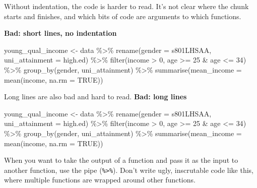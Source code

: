 \documentclass[
]{book}
\newenvironment{Shaded}{\begin{snugshade}}{\end{snugshade}}
\newcommand{\AttributeTok}[1]{\textcolor[rgb]{0.77,0.63,0.00}{#1}}
\newcommand{\ConstantTok}[1]{\textcolor[rgb]{0.00,0.00,0.00}{#1}}
\newcommand{\DecValTok}[1]{\textcolor[rgb]{0.00,0.00,0.81}{#1}}
\newcommand{\FunctionTok}[1]{\textcolor[rgb]{0.00,0.00,0.00}{#1}}
\newcommand{\NormalTok}[1]{#1}
\newcommand{\OtherTok}[1]{\textcolor[rgb]{0.56,0.35,0.01}{#1}}
\newcommand{\SpecialCharTok}[1]{\textcolor[rgb]{0.00,0.00,0.00}{#1}}
\begin{document}
Without indentation, the code is harder to read. It's not clear where the chunk starts and finishes, and which bits of code are arguments to which functions.

\textbf{Bad: short lines, no indentation}

\begin{Shaded}
\begin{Highlighting}[]
\NormalTok{young\_qual\_income }\OtherTok{\textless{}{-}}\NormalTok{ data }\SpecialCharTok{\%\textgreater{}\%} 
\FunctionTok{rename}\NormalTok{(}\AttributeTok{gender =}\NormalTok{ s801LHSAA,}
\AttributeTok{uni\_attainment =}\NormalTok{ high.ed) }\SpecialCharTok{\%\textgreater{}\%} 
\FunctionTok{filter}\NormalTok{(income }\SpecialCharTok{\textgreater{}} \DecValTok{0}\NormalTok{,}
\NormalTok{age }\SpecialCharTok{\textgreater{}=} \DecValTok{25} \SpecialCharTok{\&}\NormalTok{ age }\SpecialCharTok{\textless{}=} \DecValTok{34}\NormalTok{) }\SpecialCharTok{\%\textgreater{}\%}
\FunctionTok{group\_by}\NormalTok{(gender, uni\_attainment) }\SpecialCharTok{\%\textgreater{}\%} 
\FunctionTok{summarise}\NormalTok{(}\AttributeTok{mean\_income =} \FunctionTok{mean}\NormalTok{(income, }\AttributeTok{na.rm =} \ConstantTok{TRUE}\NormalTok{))}
\end{Highlighting}
\end{Shaded}

Long lines are also bad and hard to read.
\textbf{Bad: long lines}

\begin{Shaded}
\begin{Highlighting}[]
\NormalTok{young\_qual\_income }\OtherTok{\textless{}{-}}\NormalTok{ data }\SpecialCharTok{\%\textgreater{}\%} \FunctionTok{rename}\NormalTok{(}\AttributeTok{gender =}\NormalTok{ s801LHSAA, }\AttributeTok{uni\_attainment =}\NormalTok{ high.ed) }\SpecialCharTok{\%\textgreater{}\%} \FunctionTok{filter}\NormalTok{(income }\SpecialCharTok{\textgreater{}} \DecValTok{0}\NormalTok{, age }\SpecialCharTok{\textgreater{}=} \DecValTok{25} \SpecialCharTok{\&}\NormalTok{ age }\SpecialCharTok{\textless{}=} \DecValTok{34}\NormalTok{) }\SpecialCharTok{\%\textgreater{}\%} \FunctionTok{group\_by}\NormalTok{(gender, uni\_attainment) }\SpecialCharTok{\%\textgreater{}\%} \FunctionTok{summarise}\NormalTok{(}\AttributeTok{mean\_income =} \FunctionTok{mean}\NormalTok{(income, }\AttributeTok{na.rm =} \ConstantTok{TRUE}\NormalTok{))}
\end{Highlighting}
\end{Shaded}

When you want to take the output of a function and pass it as the input to another function, use the pipe (\texttt{\%\textgreater{}\%}). Don't write ugly, inscrutable code like this, where multiple functions are wrapped around other functions.
\end{document}
